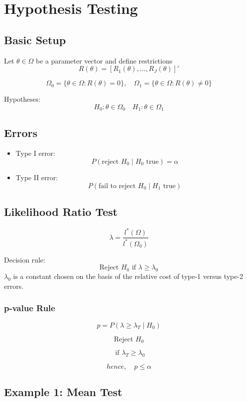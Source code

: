 \chapter{Hypothesis Testing}

\section{Basic Setup}

Let $\theta \in \Omega$ be a parameter vector and define restrictions
\[
R(\theta) = [R_1(\theta), \dots, R_J(\theta)]'
\]

\[
\Omega_0 = \{\theta \in \Omega : R(\theta)=0\}, \quad
\Omega_1 = \{\theta \in \Omega : R(\theta)\neq 0\}
\]

Hypotheses:
\[
H_0: \theta \in \Omega_0
\quad
H_1: \theta \in \Omega_1
\]

\section{Errors}

\begin{itemize}
    \item Type I error:
    \[
    P(\text{reject } H_0 \mid H_0 \text{ true}) = \alpha
    \]
    \item Type II error:
    \[
    P(\text{fail to reject } H_0 \mid H_1 \text{ true})
    \]
\end{itemize}

\section{Likelihood Ratio Test}

\[
\lambda = \frac{l^*(\Omega)}{l^*(\Omega_0)}
\]

Decision rule:
\[
\text{Reject } H_0 \text{ if } \lambda \ge \lambda_0
\]
$\lambda_0$ is a constant chosen on the basis of the relative cost of type-1 versus type-2 errors.

\subsection{p-value Rule}

\[
p = P(\lambda \ge \lambda_T \mid H_0)
\]

\[
\text{Reject } H_0 
\]

\[
\text{ if } \lambda_T \ge \lambda_0
\]

\[
hence, \quad p \le \alpha
\]


\section{Example 1: Mean Test}

